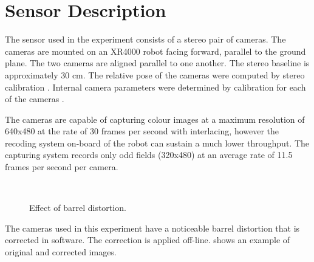 \section{Sensor Description}

The sensor used in the experiment consists of a stereo pair of
cameras. The cameras are mounted on an XR4000 robot facing forward,
parallel to the ground plane. The two cameras are aligned parallel to
one another. The stereo baseline is approximately 30 cm. The relative
pose of the cameras were computed by stereo calibration
\cite{zhang1999fcc}. Internal camera parameters were determined by
calibration for each of the cameras \cite{zhang1999fcc}. 

The cameras are capable of capturing colour images at a maximum
resolution of 640x480 at the rate of 30 frames per second with
interlacing, however the recoding system on-board of the robot can
sustain a much lower throughput. The capturing system records only odd
fields (320x480) at an average rate of 11.5 frames per second per
camera.

\begin{figure}[htbp]
  \centering
{}\\

  \caption[Barrel distortion]{Effect of barrel distortion.}
  \label{fig:barrel_distortion}
\end{figure}

The cameras used in this experiment have a noticeable barrel
distortion that is corrected in software. The correction is applied
off-line.  shows an example of
original and corrected images.


